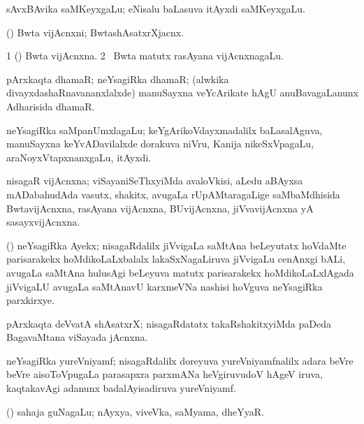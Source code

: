 \bentry
{}
\gl{\nA}
\bmng
sAvxBAvika saMKeyxgaLu; eNisalu baLasuva  itAyxdi saMKeyxgaLu. 
\emng
\eentry

\bentry
{}
\gl{\nA}
\bmng
(\pArxparx) Bwta vijAcnxni; BwtashAsatxrXjacnx. 
\emng
\eentry

\bentry
{}
\gl{\nA}
\bmng
\bnum
\num{1} (\pArxparx) Bwta vijAcnxna. 
\num{2} \sA\ Bwta matutx rasAyana vijAcnxnagaLu. 
\enum
\emng
\eentry

\bentry
{}
\gl{\nA}
\bmng
pArxkaqta dhamaR; neYsagiRka dhamaR; (alwkika divayxdashaRnavananxlalxde) manuSayxna veYcArikate hAgU anuBavagaLanunx Adharisida dhamaR. 
\emng
\eentry

\bentry
{}
\gl{\nA}
\bmng
neYsagiRka saMpanUmxlagaLu; keYgArikoVdayxmadalilx baLasalAguva, manuSayxna keYvADavilalxde dorakuva niVru, Kanija nikeSxVpagaLu, araNoyxVtapxnanxgaLu, itAyxdi. 
\emng
\eentry

\bentry
{}
\gl{\nA}
\bmng
nisagaR vijAcnxna; viSayaniSeThxyiMda avaloVkisi, aLedu aBAyxsa mADabahudAda vasutx, shakitx, avugaLa rUpAMtaragaLige saMbaMdhisida BwtavijAcnxna, rasAyana vijAcnxna, BUvijAcnxna, jiVvavijAcnxna yA sasayxvijAcnxna. 
\emng
\eentry

\bentry
{}
\gl{\nA}
\bmng
(\jiVvi) neYsagiRka Ayekx; nisagaRdalilx jiVvigaLa saMtAna beLeyutatx hoVdaMte parisarakekx hoMdikoLaLxbalalx lakaSxNagaLiruva jiVvigaLu cenAnxgi bALi, avugaLa saMtAna hulusAgi beLeyuva matutx parisarakekx hoMdikoLaLxlAgada jiVvigaLU avugaLa saMtAnavU karxmeVNa nashisi hoVguva neYsagiRka parxkirxye. 
\emng
\eentry

\bentry
{}
\gl{\nA}
\bmng
pArxkaqta deVvatA shAsatxrX; nisagaRdatatx takaRshakitxyiMda paDeda BagavaMtana viSayada jAcnxna. 
\emng
\eentry

\bentry
{}
\gl{\nA}
\bmng
neYsagiRka yureVniyamf; nisagaRdalilx doreyuva yureVniyamfnalilx adara beVre beVre aisoToVpugaLa parasapxra parxmANa heVgiruvudoV hAgeV iruva, kaqtakavAgi adanunx badalAyisadiruva yureVniyamf. 
\emng
\eentry

\bentry
{}
\gl{\nA}
\bmng
(\tashA) sahaja guNagaLu; nAyxya, viveVka, saMyama, dheYyaR. 
\emng
\eentry

